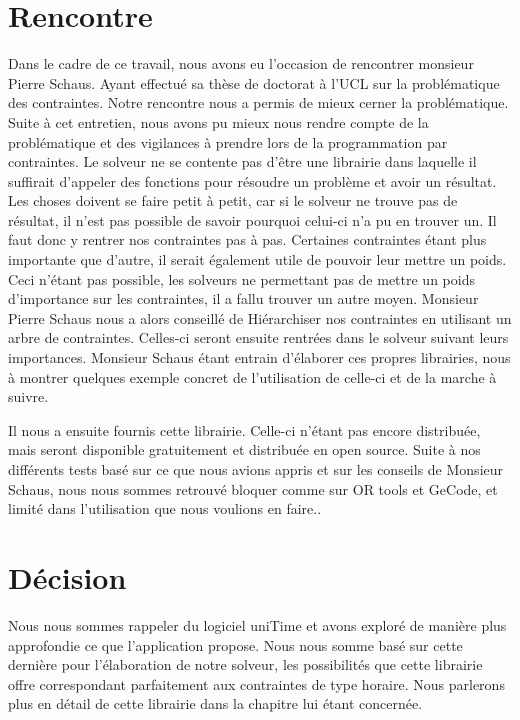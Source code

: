 \section{Rencontre}
Dans le cadre de ce travail, nous avons eu l'occasion de rencontrer monsieur Pierre Schaus. Ayant effectué sa thèse de doctorat à l'UCL sur la problématique des contraintes. Notre rencontre nous a permis de mieux cerner la problématique.
Suite à cet entretien, nous avons pu mieux nous rendre compte de la problématique et des vigilances à prendre lors de la programmation par contraintes. Le solveur ne se contente pas d'être une librairie dans laquelle il suffirait d'appeler des fonctions pour résoudre un problème et avoir un résultat. Les choses doivent se faire petit à petit, car si le solveur ne trouve pas de résultat, il n'est pas possible de savoir pourquoi celui-ci n'a pu en trouver un. Il faut donc y rentrer nos contraintes pas à pas. Certaines contraintes étant plus importante que d'autre, il serait également utile de pouvoir leur mettre un poids. Ceci n'étant pas possible, les solveurs ne permettant pas de mettre un poids d'importance sur les contraintes, il a fallu trouver un autre moyen. Monsieur Pierre Schaus nous a alors conseillé de Hiérarchiser nos contraintes en utilisant un arbre de contraintes. Celles-ci seront ensuite rentrées dans le solveur suivant leurs importances. Monsieur Schaus étant entrain d'élaborer ces propres librairies, nous à montrer quelques exemple concret de l'utilisation de celle-ci et de la marche à suivre.

Il nous a ensuite fournis cette librairie. Celle-ci n'étant pas encore distribuée, mais seront disponible gratuitement et distribuée en open source. Suite à nos différents tests basé sur ce que nous avions appris et sur les conseils de Monsieur Schaus, nous nous sommes retrouvé bloquer comme sur OR tools et GeCode, et limité dans l'utilisation que nous voulions en faire..

\section{Décision}
Nous nous sommes rappeler du logiciel uniTime et avons exploré de manière plus approfondie ce que l'application propose. Nous nous somme basé sur cette dernière pour l'élaboration de notre solveur, les possibilités que cette librairie offre correspondant parfaitement aux contraintes de type horaire. Nous parlerons plus en détail de cette librairie dans la chapitre lui étant concernée.
